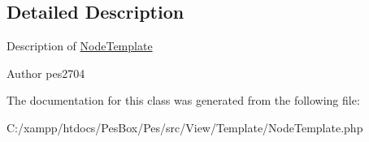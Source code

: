 \subsection{Detailed Description}
Description of \mbox{\hyperlink{class_pes_1_1_view_1_1_template_1_1_node_template}{Node\+Template}}

\begin{DoxyAuthor}{Author}
pes2704 
\end{DoxyAuthor}


The documentation for this class was generated from the following file\+:\begin{DoxyCompactItemize}
\item 
C\+:/xampp/htdocs/\+Pes\+Box/\+Pes/src/\+View/\+Template/Node\+Template.\+php\end{DoxyCompactItemize}

